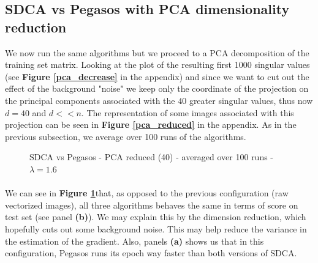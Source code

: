 \documentclass[10pt,a4paper]{article}
\begin{document}
\FloatBarrier
\subsection {SDCA vs Pegasos with PCA dimensionality reduction}

We now run the same algorithms but we proceed to a PCA decomposition of the training set matrix. Looking at the plot of the resulting first 1000 singular values (see \textbf{Figure \ref{pca_decrease}} in the appendix) and since we want to cut out the effect of the background "noise" we keep only the coordinate of the projection on the principal components associated with the $40$ greater singular values, thus now $d=40$ and $d << n$. The representation of some images associated with this projection can be seen in \textbf{Figure \ref{pca_reduced}} in the appendix. As in the previous subsection, we average over 100 runs of the algorithms.




\begin{figure}[!tbp]
  \centering
  \hfill
  \hfill
  \caption{SDCA vs Pegasos - PCA reduced (40) - averaged over 100 runs - $\lambda = 1.6$}\label{comparison_pca}
\end{figure}


\paragraph{}
We can see in \textbf{Figure \ref{comparison_pca}}that, as opposed to the previous configuration (raw vectorized images), all three algorithms behaves the same in terms of score on test set (see panel \textbf{(b)}). We may explain this by the dimension reduction, which hopefully cuts out some background noise. This may help reduce the variance in the estimation of the gradient.
Also, panels \textbf{(a)} shows us that in this configuration, Pegasos runs its epoch way faster than both versions of SDCA. 
\end{document}
